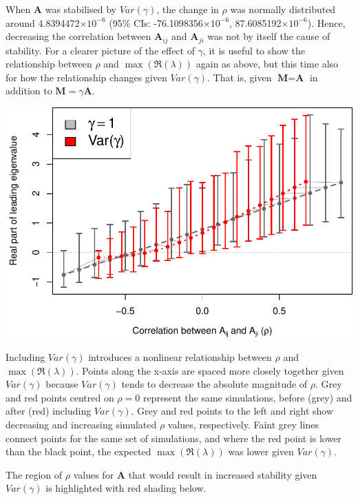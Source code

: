 \documentclass[]{article}
\begin{document}
When \(\textbf{A}\) was stabilised by \(Var(\gamma)\), the change in
\(\rho\) was normally distributed around 4.8394472\(\times 10^{-6}\)
(95\% CIs: -76.1098356\(\times 10^{-6}\), 87.6085192\(\times 10^{-6}\)).
Hence, decreasing the correlation between \(\textbf{A}_{ij}\) and
\(\textbf{A}_{ji}\) was not by itself the cause of stability. For a
clearer picture of the effect of \(\gamma\), it is useful to show the
relationship between \(\rho\) and \(\max(\Re(\lambda))\) again as above,
but this time also for how the relationship changes given
\(Var(\gamma)\). That is, given \(\textbf{M} = \textbf{A}\) in addition
to \(\textbf{M} = \gamma\textbf{A}\).

\includegraphics{revision_notes_files/figure-latex/unnamed-chunk-11-1.pdf}

Including \(Var(\gamma)\) introduces a nonlinear relationship between
\(\rho\) and \(\max(\Re(\lambda))\). Points along the x-axis are spaced
more closely together given \(Var(\gamma)\) because \(Var(\gamma)\)
tends to decrease the absolute magnitude of \(\rho\). Grey and red
points centred on \(\rho = 0\) represent the same simulations, before
(grey) and after (red) including \(Var(\gamma)\). Grey and red points to
the left and right show decreasing and increasing simulated \(\rho\)
values, respectively. Faint grey lines connect points for the same set
of simulations, and where the red point is lower than the black point,
the expected \(\max(\Re(\lambda))\) was lower given \(Var(\gamma)\).

The region of \(\rho\) values for \(\textbf{A}\) that would result in
increased stability given \(Var(\gamma)\) is highlighted with red
shading below.
\end{document}

